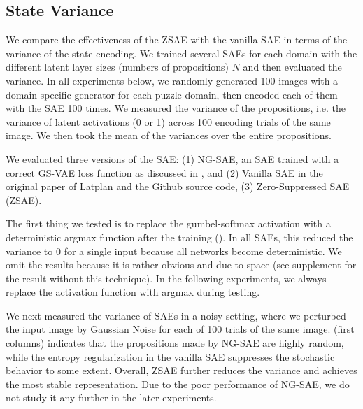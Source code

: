 \subsection{State Variance}

We compare the effectiveness of the ZSAE with the vanilla SAE in terms of the variance of the state encoding.
We trained several SAEs for each domain with the different latent layer sizes (numbers of propositions) $N$
and then evaluated the variance.
In all experiments below,
we randomly generated 100 images with a domain-specific generator for each puzzle domain,
then encoded each of them with the SAE 100 times.
We measured the variance of the propositions, i.e. the variance of latent activations (0 or 1)
across 100 encoding trials of the same image.
We then took the mean of the variances over the entire propositions.

We evaluated three versions of the SAE:
(1) NG-SAE, an SAE trained with a correct GS-VAE loss function as discussed in , and
(2) Vanilla SAE in the original paper of Latplan \cite{Asai2018} and the Github source code,
(3) Zero-Suppressed SAE (ZSAE).

The first thing we tested is to replace the gumbel-softmax activation with a deterministic argmax function
after the training ().
In all SAEs, this reduced the variance to 0 for a single input because all networks become deterministic.
We omit the results because it is rather obvious and due to space
(see supplement  for the result without this technique).
In the following experiments, we always replace the activation function with argmax during testing.

We next measured the variance of SAEs in a noisy setting, where
we perturbed the input image by Gaussian Noise for each of 100 trials of the same image.
 (first columns) indicates that
the propositions made by NG-SAE are highly random,
while the entropy regularization in the vanilla SAE suppresses the stochastic behavior to some extent.
Overall, ZSAE further reduces the variance and achieves the most stable representation.
% 
Due to the poor performance of NG-SAE, we do not study it any further in the later experiments.

